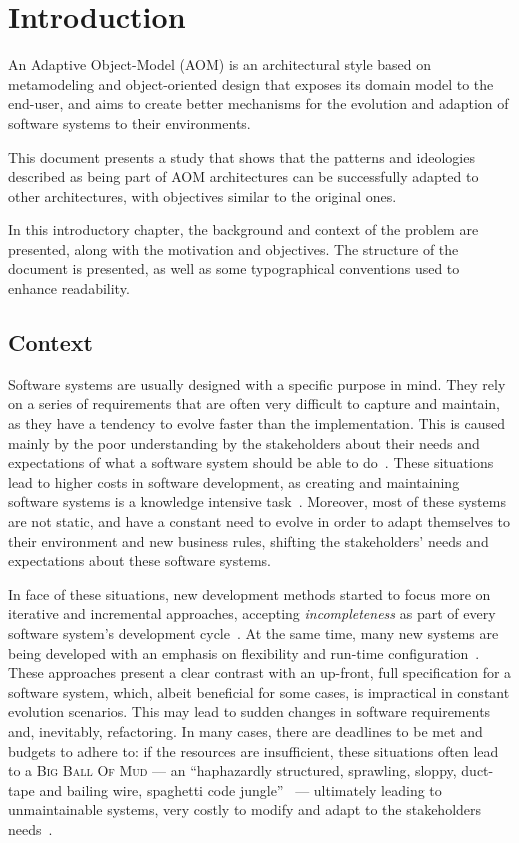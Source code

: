 \chapter{Introduction}\label{chap:intro}

An Adaptive Object-Model (AOM) is an architectural style based on metamodeling and object-oriented design that exposes its domain model to the end-user, and aims to create better mechanisms for the evolution and adaption of software systems to their environments.

This document presents a study that shows that the patterns and ideologies described as being part of AOM architectures can be successfully adapted to other architectures, with objectives similar to the original ones.

In this introductory chapter, the background and context of the problem are presented, along with the motivation and objectives. The structure of the document is presented, as well as some typographical conventions used to enhance readability.

\section{Context}\label{sec:context}

Software systems are usually designed with a specific purpose in mind. They rely on a series of requirements that are often very difficult to capture and maintain, as they have a tendency to evolve faster than the implementation. This is caused mainly by the poor understanding by the stakeholders about their needs and expectations of what a software system should be able to do~\cite{PT07}. These situations lead to higher costs in software development, as creating and maintaining software systems is a knowledge intensive task~\cite{AdOdSBD07}. Moreover, most of these systems are not static, and have a constant need to evolve in order to adapt themselves to their environment and new business rules, shifting the stakeholders' needs and expectations about these software systems.

In face of these situations, new development methods started to focus more on iterative and incremental approaches, accepting \emph{incompleteness} as part of every software system's development cycle~\cite{WC03}. At the same time, many new systems are being developed with an emphasis on flexibility and run-time configuration~\cite{YJ02}. These approaches present a clear contrast with an up-front, full specification for a software system, which, albeit beneficial for some cases, is impractical in constant evolution scenarios. This may lead to sudden changes in software requirements and, inevitably, refactoring. In many cases, there are deadlines to be met and budgets to adhere to: if the resources are insufficient, these situations often lead to a \textsc{Big Ball Of Mud} --- an ``haphazardly structured, sprawling, sloppy, duct-tape and bailing wire, spaghetti code jungle''~\cite{big_ball_of_mud} --- ultimately leading to unmaintainable systems, very costly to modify and adapt to the stakeholders needs~\cite{FY97}.

